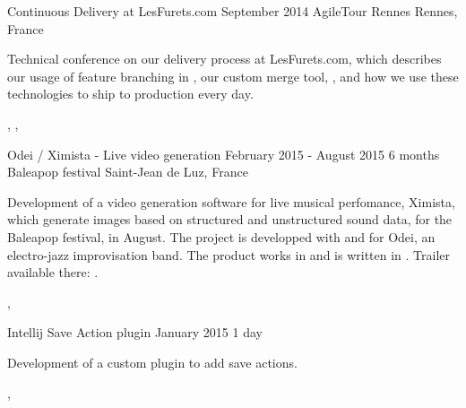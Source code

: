 \documentclass[a4paper]{article}
\begin{document}
\cvexperiencetitle
  {Continuous Delivery at LesFurets.com}
  {}
  {September 2014}
  {AgileTour Rennes}
  {Rennes, France}

\begin{cvexperience}%
  Technical conference on our delivery process at LesFurets.com, which
  describes our usage of feature branching in , our custom merge
  tool, , and how we use these technologies to ship to
  production every day.

  \begin{cvexperiencetech}[Tags]%
    ,
    ,
  \end{cvexperiencetech}
\end{cvexperience}



\cvexperiencetitle
{Odei / Ximista - Live video generation}
{February 2015 - August 2015}
{6 months}
{Baleapop festival}
{Saint-Jean de Luz, France}

\begin{cvexperience}%
  Development of a video generation software for live musical perfomance,
  Ximista, which generate images based on structured and unstructured sound
  data, for the Baleapop festival, in August. The project is developped with
  and for Odei, an electro-jazz improvisation band. The product works in
   and is written in . Trailer available
  there: .

  \begin{cvexperiencetech}[Technologies]%
    ,
  \end{cvexperiencetech}
\end{cvexperience}

\cvexperiencetitle
{Intellij Save Action plugin}
{January 2015}
{1 day}
{}
{}

\begin{cvexperience}%
  Development of a custom  plugin to add save actions.

  \begin{cvexperiencetech}[Technologies]%
    ,
  \end{cvexperiencetech}
\end{cvexperience}
\end{document}
